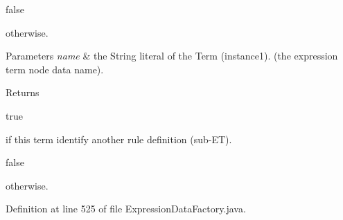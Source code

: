 \begin{DoxyCode}
\textcolor{keyword}{false} 
\end{DoxyCode}
 otherwise. 
\begin{DoxyParams}{Parameters}
{\em name} & the String literal of the Term (instance1). (the expression term node data name). \\
\hline
\end{DoxyParams}
\begin{DoxyReturn}{Returns}

\begin{DoxyCode}
\textcolor{keyword}{true} 
\end{DoxyCode}
 if this term identify another rule definition (sub-\/\-E\-T). 
\begin{DoxyCode}
\textcolor{keyword}{false} 
\end{DoxyCode}
 otherwise. 
\end{DoxyReturn}


Definition at line 525 of file Expression\-Data\-Factory.\-java.

